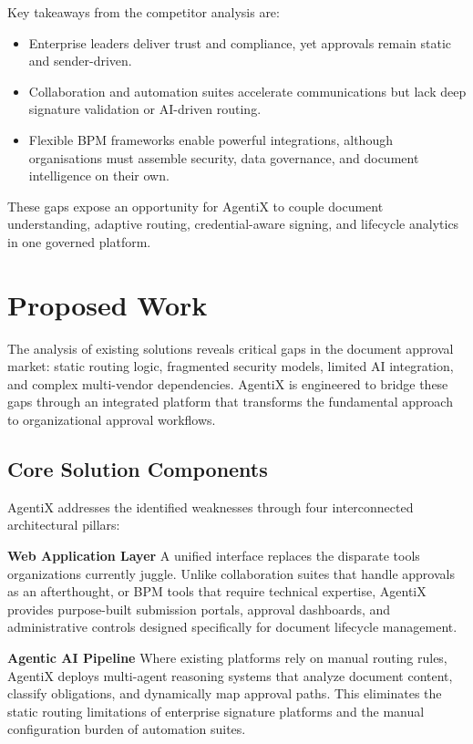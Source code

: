 \documentclass[12pt,oneside,openright,a4paper]{cpe-english-project}
\begin{document}
\newpage

Key takeaways from the competitor analysis are:

\begin{itemize}
\item Enterprise leaders deliver trust and compliance, yet approvals remain static and sender-driven.
\item Collaboration and automation suites accelerate communications but lack deep signature validation or AI-driven routing.
\item Flexible BPM frameworks enable powerful integrations, although organisations must assemble security, data governance, and document intelligence on their own.
\end{itemize}

These gaps expose an opportunity for AgentiX to couple document understanding, adaptive routing, credential-aware signing, and lifecycle analytics in one governed platform.\sloppy

\newpage

\chapter{Proposed Work}

The analysis of existing solutions reveals critical gaps in the document approval market: static routing logic, fragmented security models, limited AI integration, and complex multi-vendor dependencies. AgentiX is engineered to bridge these gaps through an integrated platform that transforms the fundamental approach to organizational approval workflows.

\vspace{0.3cm}

\section{Core Solution Components}

AgentiX addresses the identified weaknesses through four interconnected architectural pillars:

\textbf{Web Application Layer}
A unified interface replaces the disparate tools organizations currently juggle. Unlike collaboration suites that handle approvals as an afterthought, or BPM tools that require technical expertise, AgentiX provides purpose-built submission portals, approval dashboards, and administrative controls designed specifically for document lifecycle management.

\textbf{Agentic AI Pipeline}
Where existing platforms rely on manual routing rules, AgentiX deploys multi-agent reasoning systems that analyze document content, classify obligations, and dynamically map approval paths. This eliminates the static routing limitations of enterprise signature platforms and the manual configuration burden of automation suites.
\end{document}
